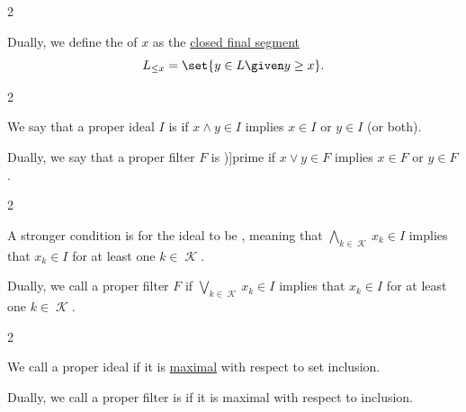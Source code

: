 \begin{definition}
\begin{thmenum}
\begin{paracol}{2}
      \begin{rightcolumn}
        Dually, we define the  of \( x \) as the \hyperref[def:order_interval/unbounded]{closed final segment}
        \begin{equation*}
          L_{\leq x} = \set{ y \in L \given y \geq x }.
        \end{equation*}
      \end{rightcolumn}
    \end{paracol}

    \begin{paracol}{2}
      \begin{leftcolumn}
        We say that a proper ideal \( I \) is  if \( {x \wedge y \in I} \) implies \( {x \in I} \) or \( {y \in I} \) (or both).
      \end{leftcolumn}

      \begin{rightcolumn}
        Dually, we say that a proper filter \( F \) is \term[ru=простой (фильтр) (\cite[183]{Гуров2013ТеорияРешёток})]{prime} if \( {x \vee y \in F} \) implies \( {x \in F} \) or \( {y \in F} \).
      \end{rightcolumn}
    \end{paracol}

    \begin{paracol}{2}
      \begin{leftcolumn}\mimprovised
        A stronger condition is for the ideal to be , meaning that \( \bigwedge_{k \in \mscrK} x_k \in I \) implies that \( x_k \in I \) for at least one \( k \in \mscrK \).
      \end{leftcolumn}

      \begin{rightcolumn}
        Dually, we call a proper filter \( F \)  if \( \bigvee_{k \in \mscrK} x_k \in I \) implies that \( x_k \in I \) for at least one \( k \in \mscrK \).
      \end{rightcolumn}
    \end{paracol}

    \begin{paracol}{2}
      \begin{leftcolumn}
        We call a proper ideal  if it is \hyperref[def:extremal_points/maximal_and_minimal_element]{maximal} with respect to set inclusion.
      \end{leftcolumn}

      \begin{rightcolumn}
        Dually, we call a proper filter is  if it is maximal with respect to inclusion.
      \end{rightcolumn}
    \end{paracol}
  \end{thmenum}
\end{definition}
